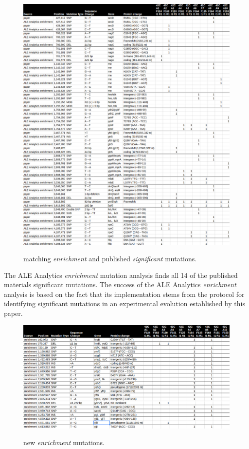 \documentclass[12pt,final,masters,chapterheads]{ucsd}  %
\begin{document}
\begin{figure}[h!]
  \caption{matching \textit{enrichment} and published \textit{significant} mutations.}
  \centering
  \includegraphics[width=\textwidth]{42c_matching_muts.png}
  \label{fig:42c_matching_muts}
\end{figure}

The ALE Analytics \textit{enrichment} mutation analysis finds all 14 of the published materials significant mutations. The success of the ALE Analytics \textit{enrichment} analysis is based on the fact that its implementation stems from the protocol for identifying significant mutations in an experimental evolution established by this paper.

\begin{figure}[h!]
  \caption{new \textit{enrichment} mutations.}
  \centering
  \includegraphics[width=\textwidth]{42c_new_enrich_muts.png}
  \label{fig:42c_new_enrich_muts}
\end{figure}
\end{document}
